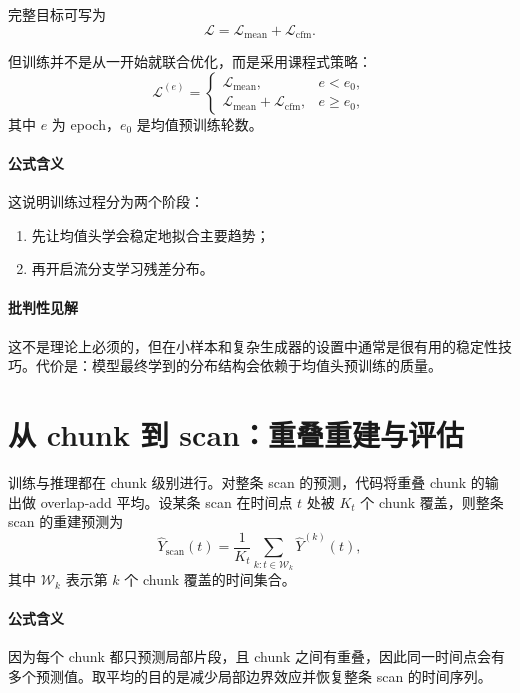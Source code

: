 \documentclass[11pt,a4paper]{ctexart}
\begin{document}
完整目标可写为
\begin{equation}
\mathcal{L} = \mathcal{L}_{\mathrm{mean}} + \mathcal{L}_{\mathrm{cfm}}.
\end{equation}

但训练并不是从一开始就联合优化，而是采用课程式策略：
\begin{equation}
\mathcal{L}^{(e)} =
\begin{cases}
\mathcal{L}_{\mathrm{mean}}, & e < e_0, \\
\mathcal{L}_{\mathrm{mean}} + \mathcal{L}_{\mathrm{cfm}}, & e \ge e_0,
\end{cases}
\end{equation}
其中 $e$ 为 epoch，$e_0$ 是均值预训练轮数。

\paragraph{公式含义}
这说明训练过程分为两个阶段：
\begin{enumerate}
  \item 先让均值头学会稳定地拟合主要趋势；
  \item 再开启流分支学习残差分布。
\end{enumerate}

\paragraph{批判性见解}
这不是理论上必须的，但在小样本和复杂生成器的设置中通常是很有用的稳定性技巧。代价是：模型最终学到的分布结构会依赖于均值头预训练的质量。

\section{从 chunk 到 scan：重叠重建与评估}

训练与推理都在 chunk 级别进行。对整条 scan 的预测，代码将重叠 chunk 的输出做 overlap-add 平均。设某条 scan 在时间点 $t$ 处被 $K_t$ 个 chunk 覆盖，则整条 scan 的重建预测为
\begin{equation}
\hat{Y}_{\mathrm{scan}}(t)
=
\frac{1}{K_t}
\sum_{k: t \in \mathcal{W}_k}
\hat{Y}^{(k)}(t),
\end{equation}
其中 $\mathcal{W}_k$ 表示第 $k$ 个 chunk 覆盖的时间集合。

\paragraph{公式含义}
因为每个 chunk 都只预测局部片段，且 chunk 之间有重叠，因此同一时间点会有多个预测值。取平均的目的是减少局部边界效应并恢复整条 scan 的时间序列。
\end{document}
